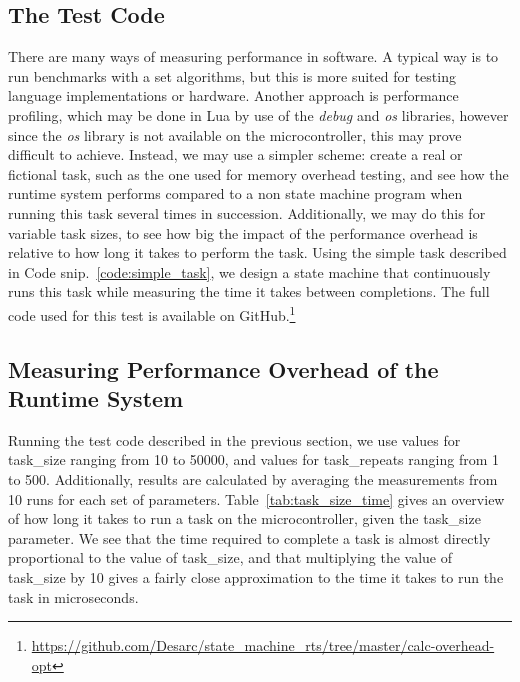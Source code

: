 \subsection{The Test Code}
\label{sec:performance_test_code}
There are many ways of measuring performance in software. A typical way is to run benchmarks with a set algorithms, but this is more suited for testing language implementations or hardware. Another approach is performance profiling, which may be done in Lua by use of the \emph{debug} and \emph{os} libraries, however since the \emph{os} library is not available on the microcontroller, this may prove difficult to achieve. Instead, we may use a simpler scheme: create a real or fictional task, such as the one used for memory overhead testing, and see how the runtime system performs compared to a non state machine program when running this task several times in succession. Additionally, we may do this for variable task sizes, to see how big the impact of the performance overhead is relative to how long it takes to perform the task. Using the simple task described in Code snip.~\ref{code:simple_task}, we design a state machine that continuously runs this task while measuring the time it takes between completions. The full code used for this test is available on GitHub.\footnote{\url{https://github.com/Desarc/state_machine_rts/tree/master/calc-overhead-opt}}

\subsection{Measuring Performance Overhead of the Runtime System}
\label{sec:performance_overhead_measure}
Running the test code described in the previous section, we use values for task\_size ranging from 10 to 50000, and values for task\_repeats ranging from 1 to 500. Additionally, results are calculated by averaging the measurements from 10 runs for each set of parameters. Table~\ref{tab:task_size_time} gives an overview of how long it takes to run a task on the microcontroller, given the task\_size parameter. We see that the time required to complete a task is almost directly proportional to the value of task\_size, and that multiplying the value of task\_size by 10 gives a fairly close approximation to the time it takes to run the task in microseconds.

